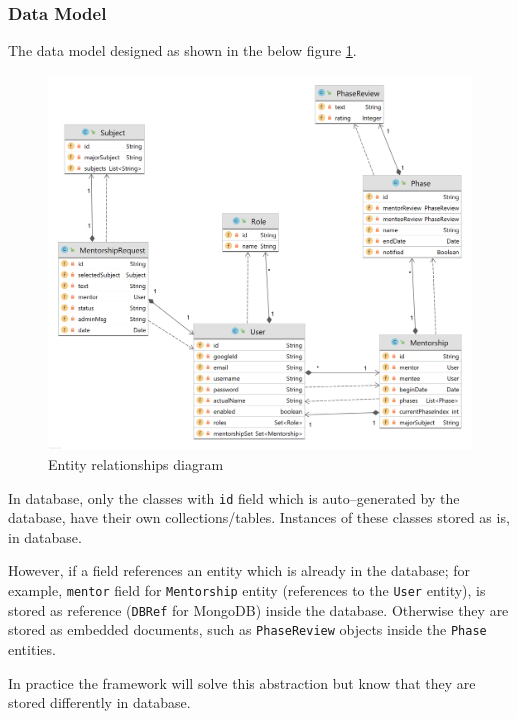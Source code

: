 \documentclass[10pt]{article}
\begin{document}
\subsubsection{Data Model} \label{data_models}
The data model designed as shown in the below figure \ref{fig:domains}.

\begin{figure}[ht!]
    \centering
    \includegraphics[width=\textwidth]{diagram-domains.png}
    \caption{Entity relationships diagram}
    \label{fig:domains}
\end{figure}

In database, only the classes with \texttt{id} field which is auto--generated by the 
database, have their own collections/tables. Instances of these classes stored as is,
in database.

However, if a field references an entity which is already in the database; for example,
\texttt{mentor} field for \texttt{Mentorship} entity (references to the \texttt{User}
entity), is stored as reference (\texttt{DBRef} for MongoDB) inside the database. 
Otherwise they are stored as embedded documents, such as \texttt{PhaseReview} objects
inside the \texttt{Phase} entities.

In practice the framework will solve this abstraction but know that they are stored
differently in database.
\newpage
\end{document}
